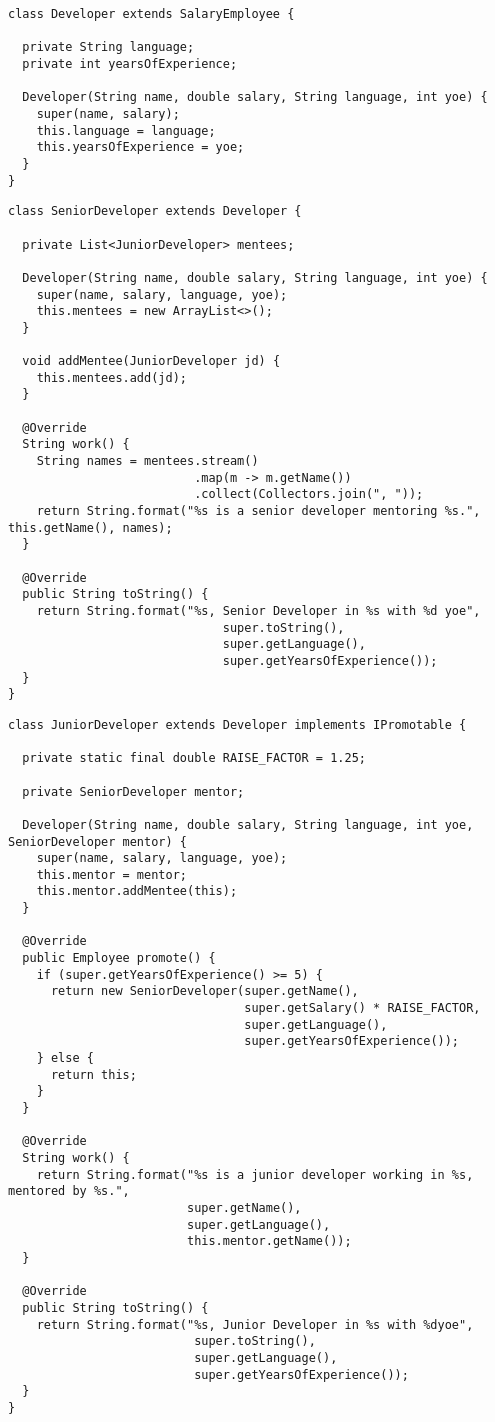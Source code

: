 \begin{lstlisting}[language=MyJava]
class Developer extends SalaryEmployee {

  private String language;
  private int yearsOfExperience;

  Developer(String name, double salary, String language, int yoe) {
    super(name, salary);
    this.language = language;
    this.yearsOfExperience = yoe;
  }
}
\end{lstlisting}

\begin{lstlisting}[language=MyJava]
class SeniorDeveloper extends Developer {

  private List<JuniorDeveloper> mentees;

  Developer(String name, double salary, String language, int yoe) {
    super(name, salary, language, yoe);
    this.mentees = new ArrayList<>();
  }

  void addMentee(JuniorDeveloper jd) {
    this.mentees.add(jd);
  }

  @Override
  String work() {
    String names = mentees.stream()
                          .map(m -> m.getName())
                          .collect(Collectors.join(", "));
    return String.format("%s is a senior developer mentoring %s.", this.getName(), names);
  }

  @Override
  public String toString() {
    return String.format("%s, Senior Developer in %s with %d yoe", 
                              super.toString(), 
                              super.getLanguage(),
                              super.getYearsOfExperience());
  }
}
\end{lstlisting}

\begin{lstlisting}[language=MyJava]
class JuniorDeveloper extends Developer implements IPromotable {

  private static final double RAISE_FACTOR = 1.25;

  private SeniorDeveloper mentor;

  Developer(String name, double salary, String language, int yoe, SeniorDeveloper mentor) {
    super(name, salary, language, yoe);
    this.mentor = mentor;
    this.mentor.addMentee(this);
  }

  @Override
  public Employee promote() {
    if (super.getYearsOfExperience() >= 5) {
      return new SeniorDeveloper(super.getName(), 
                                 super.getSalary() * RAISE_FACTOR, 
                                 super.getLanguage(), 
                                 super.getYearsOfExperience());
    } else {
      return this;
    }
  }

  @Override
  String work() {
    return String.format("%s is a junior developer working in %s, mentored by %s.", 
                         super.getName(),
                         super.getLanguage(),
                         this.mentor.getName());
  }

  @Override
  public String toString() {
    return String.format("%s, Junior Developer in %s with %dyoe", 
                          super.toString(),
                          super.getLanguage(),
                          super.getYearsOfExperience());
  }
}
\end{lstlisting}

